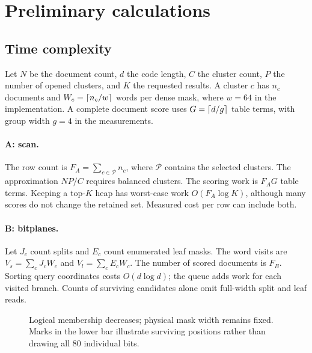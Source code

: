 \newpage
\section{Preliminary calculations}
\subsection{Time complexity}
Let $N$ be the document count, $d$ the code length, $C$ the cluster count, $P$ the number of
opened clusters, and $K$ the requested results. A cluster $c$ has $n_c$ documents and
$W_c=\left\lceil n_c/w\right\rceil$ words per dense mask, where $w=64$ in the implementation. A complete
document score uses $G=\left\lceil d/g\right\rceil$ table terms, with group width $g=4$ in the measurements.

\paragraph{A: scan.} The row count is $F_A=\sum_{c\in\mathcal P}n_c$, where $\mathcal P$
contains the selected clusters. The approximation $NP/C$ requires balanced clusters. The
scoring work is $F_AG$ table terms. Keeping a top-$K$ heap has worst-case work $O(F_A\log K)$,
although many scores do not change the retained set. Measured cost per row can include both.

\paragraph{B: bitplanes.} Let $J_c$ count splits and $E_c$ count enumerated leaf masks.
The word visits are $V_s=\sum_cJ_cW_c$ and $V_l=\sum_cE_cW_c$. The number of scored documents
is $F_B$. Sorting query coordinates costs $O(d\log d)$; the queue adds work for each visited
branch. Counts of surviving candidates alone omit full-width split and leaf reads.

\begin{figure}[H]\centering
{}
\caption{Logical membership decreases; physical mask width remains fixed. Marks in the lower
bar illustrate surviving positions rather than drawing all 80 individual bits.}
\end{figure}

